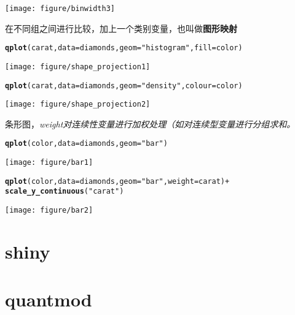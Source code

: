 \documentclass{article}\usepackage[]{graphicx}\usepackage[]{color}
\makeatletter
\def\maxwidth{ %
  \ifdim\Gin@nat@width>\linewidth
    \linewidth
  \else
    \Gin@nat@width
  \fi
}
\newcommand{\hlstr}[1]{\textcolor[rgb]{0.192,0.494,0.8}{#1}}%
\newcommand{\hlopt}[1]{\textcolor[rgb]{0,0,0}{#1}}%
\newcommand{\hlstd}[1]{\textcolor[rgb]{0.345,0.345,0.345}{#1}}%
\newcommand{\hlkwc}[1]{\textcolor[rgb]{0.333,0.667,0.333}{#1}}%
\newcommand{\hlkwd}[1]{\textcolor[rgb]{0.737,0.353,0.396}{\textbf{#1}}}%
\newenvironment{kframe}{%
 \def\at@end@of@kframe{}%
 \ifinner\ifhmode%
  \def\at@end@of@kframe{\end{minipage}}%
  \begin{minipage}{\columnwidth}%
 \fi\fi%
 \def\FrameCommand##1{\hskip\@totalleftmargin \hskip-\fboxsep
 \colorbox{shadecolor}{##1}\hskip-\fboxsep
     \hskip-\linewidth \hskip-\@totalleftmargin \hskip\columnwidth}%
 \MakeFramed {\advance\hsize-\width
   \@totalleftmargin\z@ \linewidth\hsize
   \@setminipage}}%
 {\par\unskip\endMakeFramed%
 \at@end@of@kframe}
\newenvironment{knitrout}{}{} %
\makeatother
\begin{document}
\begin{CJK*}{UTF8}{gkai}
\begin{knitrout}
\begin{kframe}
{\ttfamily\noindent\color{warningcolor}{\#\# Warning: position\_stack requires constant width: output may be incorrect}}\end{kframe}
\texttt{[image: figure/binwidth3]} 

\end{knitrout}
在不同组之间进行比较，加上一个类别变量，也叫做\textbf{图形映射}
\begin{knitrout}
\color{fgcolor}\begin{kframe}
\begin{alltt}
\hlkwd{qplot}\hlstd{(carat,} \hlkwc{data} \hlstd{= diamonds,} \hlkwc{geom} \hlstd{=} \hlstr{"histogram"}\hlstd{,} \hlkwc{fill} \hlstd{= color)}
\end{alltt}


{\ttfamily\noindent\itshape\color{messagecolor}{\#\# stat\_bin: binwidth defaulted to range/30. Use 'binwidth = x' to adjust this.}}\end{kframe}
\texttt{[image: figure/shape\_projection1]} 
\begin{kframe}\begin{alltt}
\hlkwd{qplot}\hlstd{(carat,} \hlkwc{data} \hlstd{= diamonds,} \hlkwc{geom} \hlstd{=} \hlstr{"density"}\hlstd{,} \hlkwc{colour} \hlstd{= color)}
\end{alltt}
\end{kframe}
\texttt{[image: figure/shape\_projection2]} 

\end{knitrout}
条形图，\em{weight}对连续性变量进行加权处理（如对连续型变量进行分组求和。
\begin{knitrout}
\color{fgcolor}\begin{kframe}
\begin{alltt}
\hlkwd{qplot}\hlstd{(color,} \hlkwc{data} \hlstd{= diamonds,} \hlkwc{geom} \hlstd{=} \hlstr{"bar"}\hlstd{)}
\end{alltt}
\end{kframe}
\texttt{[image: figure/bar1]} 
\begin{kframe}\begin{alltt}
\hlkwd{qplot}\hlstd{(color,} \hlkwc{data} \hlstd{= diamonds,} \hlkwc{geom} \hlstd{=} \hlstr{"bar"}\hlstd{,} \hlkwc{weight} \hlstd{= carat)} \hlopt{+}
\hlkwd{scale_y_continuous}\hlstd{(}\hlstr{"carat"}\hlstd{)}
\end{alltt}
\end{kframe}
\texttt{[image: figure/bar2]} 

\end{knitrout}






\section{shiny}
\section{quantmod}

\newpage
\end{CJK*}
\end{document}
